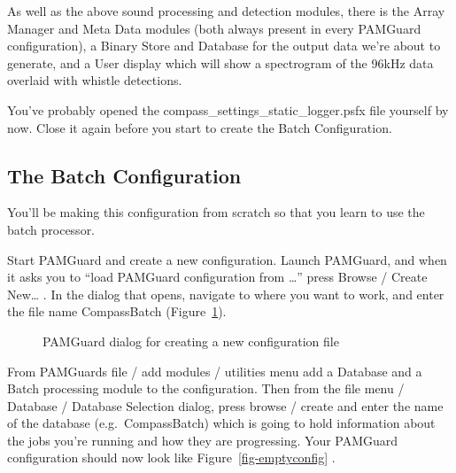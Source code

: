 \documentclass[
]{article}
\begin{document}
As well as the above sound processing and detection modules, there is
the Array Manager and Meta Data modules (both always present in every
PAMGuard configuration), a Binary Store and Database for the output data
we're about to generate, and a User display which will show a
spectrogram of the 96kHz data overlaid with whistle detections.

You've probably opened the compass\_settings\_static\_logger.psfx file
yourself by now. Close it again before you start to create the Batch
Configuration.

\subsection{The Batch Configuration}\label{the-batch-configuration}

You'll be making this configuration from scratch so that you learn to
use the batch processor.

Start PAMGuard and create a new configuration. Launch PAMGuard, and when
it asks you to ``load PAMGuard configuration from \ldots{}'' press
Browse / Create New\ldots{} . In the dialog that opens, navigate to
where you want to work, and enter the file name CompassBatch
(Figure~\ref{fig-createpsfx}).

\begin{figure}


\caption{\label{fig-createpsfx}PAMGuard dialog for creating a new
configuration file}

\end{figure}%

From PAMGuards file / add modules / utilities menu add a Database and a
Batch processing module to the configuration. Then from the file menu /
Database / Database Selection dialog, press browse / create and enter
the name of the database (e.g.~CompassBatch) which is going to hold
information about the jobs you're running and how they are progressing.
Your PAMGuard configuration should now look like
Figure~\ref{fig-emptyconfig} .
\end{document}
